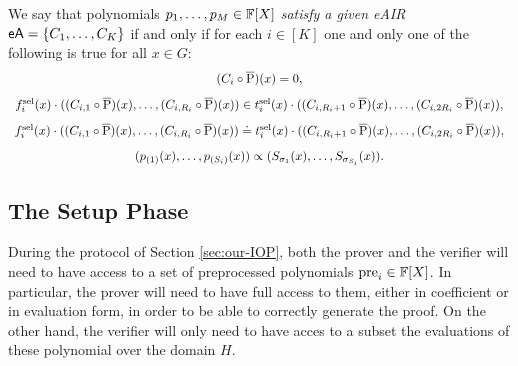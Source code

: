 \begin{definition}
  We say that polynomials $p_1,\dots,p_M \in \mathbb{F}[X]$ \textit{satisfy a given eAIR} $\textsf{eA} = \{C_1,\dots,C_K\}$ if and only if for each $i \in [K]$ one and only one of the following is true for all $x \in G$:
  \[
  \begin{array}{c}
    (C_i \circ \overline{\text{P}})(x) = 0, \\[0.3cm]
    f^{\text{sel}}_i(x) \cdot  ((C_{i,1} \circ \overline{\text{P}})(x),\dots,(C_{i,R_i} \circ \overline{\text{P}})(x)) \in t^{\text{sel}}_i(x) \cdot ((C_{i,R_i+1} \circ \overline{\text{P}})(x),\dots,(C_{i,2R_i} \circ \overline{\text{P}})(x)), \\[0.3cm]
    f^{\text{sel}}_i(x) \cdot  ((C_{i,1} \circ \overline{\text{P}})(x),\dots,(C_{i,R_i} \circ \overline{\text{P}})(x)) \doteq t^{\text{sel}}_i(x) \cdot ((C_{i,R_i+1} \circ \overline{\text{P}})(x),\dots,(C_{i,2R_i} \circ \overline{\text{P}})(x)), \\[0.3cm]
    (p_{(1)}(x),\dots,p_{(S_i)}(x)) \propto (S_{\sigma_{1}}(x),\dots,S_{\sigma_{S_i}}(x)).
  \end{array}
  \]
\end{definition}


\subsection{The Setup Phase}

During the protocol of Section \ref{sec:our-IOP}, both the prover and the verifier will need to have access to a set of preprocessed polynomials $\text{pre}_i \in \mathbb{F}[X]$. In particular, the prover will need to have full access to them, either in coefficient or in evaluation form, in order to be able to correctly generate the proof. On the other hand, the verifier will only need to have acces to a subset the evaluations of these polynomial over the domain $H$.

